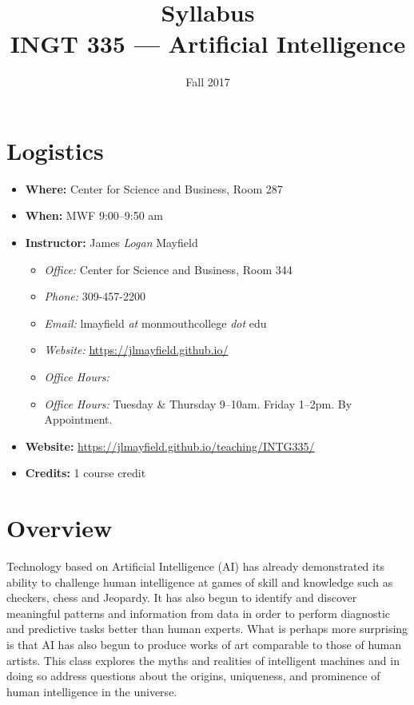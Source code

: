 \documentclass[nobib]{tufte-handout}
\title{Syllabus \\ INGT 335 --- Artificial Intelligence}
\author{}
\date{ Fall 2017 }
\begin{document}
\maketitle

\section{Logistics}
\begin{itemize}
\item \textbf{Where: } Center for Science and Business, Room 287
\item \textbf{When: } MWF 9:00--9:50 am
\item \textbf{Instructor: } James \textit{Logan} Mayfield
\begin{itemize}
\item \textit{Office: } Center for Science and Business, Room 344
\item \textit{Phone: } 309-457-2200 %
\item \textit{Email: } lmayfield \textit{at} monmouthcollege \textit{dot} edu
\item \textit{Website: } \url{https://jlmayfield.github.io/}
\item \textit{Office Hours: } \item \textit{Office Hours: } Tuesday \& Thursday 9--10am. Friday 1--2pm. By Appointment.
\end{itemize}
\item \textbf{Website: } \url{https://jlmayfield.github.io/teaching/INTG335/}
\item \textbf{Credits: } 1 course credit
\end{itemize}

\section{Overview}

Technology based on Artificial Intelligence (AI) has already demonstrated its ability to challenge human intelligence at games of skill and knowledge such as checkers, chess and Jeopardy. It has also begun to identify and discover meaningful patterns and information from data in order to perform diagnostic and predictive tasks better than human experts.  What is perhaps more surprising is that AI has also begun to produce works of art comparable to those of human artists. This class explores the myths and realities of intelligent machines and in doing so address questions about the origins, uniqueness, and prominence of human intelligence in the universe.
\end{document}
